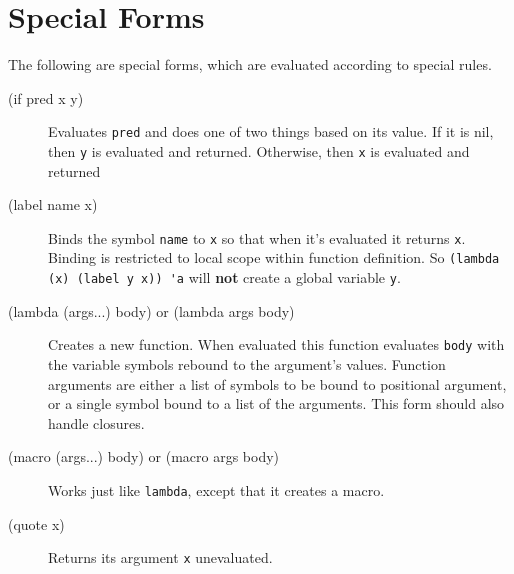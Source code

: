 \documentclass[12pt]{article}
\begin{document}
\section{Special Forms}

The following are special forms, which are evaluated according to special rules.

\begin{description}
\item[(if pred x y)] Evaluates \verb!pred! and does one of two things based on
  its value. If it is nil, then \verb!y! is evaluated and returned. Otherwise,
  then \verb!x! is evaluated and returned

\item[(label name x)] Binds the symbol \verb!name! to \verb!x! so that when it's
  evaluated it returns \verb!x!. Binding is restricted to local scope within
  function definition. So \verb!(lambda (x) (label y x)) 'a! will \textbf{not}
  create a global variable \verb!y!.

\item[(lambda (args...) body) or (lambda args body)] Creates a new
  function. When evaluated this function evaluates \verb!body! with the
  variable symbols rebound to the argument's values.  Function arguments are
  either a list of symbols to be bound to positional argument, or a single
  symbol bound to a list of the arguments. This form should also handle
  closures.

\item[(macro (args...) body) or (macro args body)] Works just like
  \verb!lambda!, except that it creates a macro.

\item[(quote x)] Returns its argument \verb!x! unevaluated.
\end{description}
\end{document}
